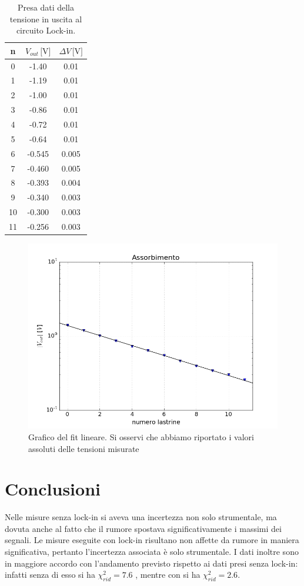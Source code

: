 \documentclass[10pt,a4paper]{article}
\begin{document}
\begin{table}
\centering
\begin{tabular}{|c|c|c|}
\hline
n	&	$V_{out}\,\mbox{[V]}$	&	$\Delta V\,\mbox{[V]}$\\
\hline
0  & -1.40 & 0.01\\
\hline
1   &-1.19  &0.01\\
\hline
2   &-1.00  &0.01\\
\hline
3   &-0.86  &0.01\\
\hline
4   &-0.72  &0.01\\
\hline
5   &-0.64  &0.01\\
\hline
6   &-0.545  &0.005\\
\hline
7   &-0.460  &0.005\\
\hline
8   &-0.393  &0.004\\
\hline
9   &-0.340  &0.003\\
\hline
10  &-0.300  &0.003\\
\hline
11  &-0.256  &0.003\\
\hline
\end{tabular}
\caption{Presa dati della tensione in uscita al circuito Lock-in.\label{tab:abs2}}
\end{table}

\begin{figure}[!htb]
  \centering
\includegraphics[scale=0.7]{plot-lin2.png}
\caption{Grafico del fit lineare. Si osservi che abbiamo riportato i valori assoluti delle tensioni misurate\label{plot2}}
\end{figure}

\section{Conclusioni}
Nelle misure senza lock-in si aveva una incertezza non solo strumentale, ma dovuta anche al fatto che il rumore spostava significativamente i massimi dei segnali.
Le misure eseguite con lock-in risultano non affette da rumore in maniera significativa, pertanto l'incertezza associata è solo strumentale.
I dati inoltre sono in maggiore accordo con l'andamento previsto rispetto ai dati presi senza lock-in: infatti senza di esso si ha $\chi_{rid} ^2 = 7.6$ ,  mentre con si ha $\chi_{rid}^2 = 2.6$.%
 
\end{document}
